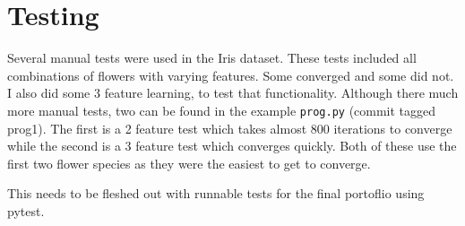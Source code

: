 \documentclass{article}
\begin{document}
\section{Testing}

Several manual tests were used in the Iris dataset. These tests included all
combinations of flowers with varying features. Some converged and some did not.
I also did some 3 feature learning, to test that functionality. Although there
much more manual tests, two can be found in the example \texttt{prog.py} (commit
tagged prog1). The first is a 2 feature test which takes almost 800 iterations
to converge while the second is a 3 feature test which converges quickly. Both
of these use the first two flower species as they were the easiest to get to
converge.

This needs to be fleshed out with runnable tests for the final portoflio using pytest.
\end{document}
